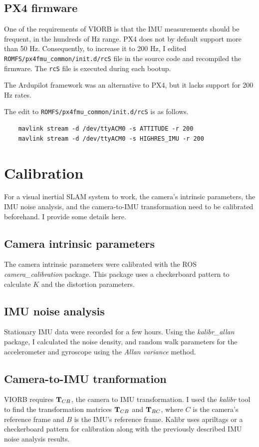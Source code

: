 \subsection{PX4 firmware}
One of the requirements of VIORB is that the IMU measurements should be frequent, in the hundreds of Hz range. PX4 does not by default support more than 50 Hz. Consequently, to increase it to 200 Hz, I edited \texttt{ROMFS/px4fmu\_common/init.d/rcS} file in the source code and recompiled the firmware.
The \texttt{rcS} file is executed during each bootup.

The Ardupilot framework was an alternative to PX4, but it lacks support for 200 Hz rates.

The edit to \texttt{ROMFS/px4fmu\_common/init.d/rcS} is as follows.

\begin{verbatim}
	mavlink stream -d /dev/ttyACM0 -s ATTITUDE -r 200        
	mavlink stream -d /dev/ttyACM0 -s HIGHRES_IMU -r 200
\end{verbatim}

\section{Calibration}
For a visual inertial SLAM system to work, the camera's intrinsic parameters, the IMU noise analysis, and the camera-to-IMU transformation need to be calibrated beforehand. I provide some details here.
 
\subsection{Camera intrinsic parameters}
The camera intrinsic parameters were calibrated with the ROS \textit{camera\_calibration} package. This package uses a checkerboard pattern to calculate $K$ and the distortion parameters.

\subsection{IMU noise analysis} \label{section:imu_bias_calculation}
Stationary IMU data were recorded for a few hours. Using the \textit{kalibr\_allan} package, I calculated the noise density, and random walk parameters for the accelerometer and gyroscope using the \textit{Allan variance} method. 

\subsection{Camera-to-IMU tranformation}
VIORB requires ${\bf T}_{CB}$, the camera to IMU transformation. I used the  \textit{kalibr} tool to find the transformation matrices ${\bf T}_{CB}$ and ${\bf T}_{BC}$, where $C$ is the camera's reference frame and $B$ is the IMU's reference frame. Kalibr uses apriltags or a checkerboard pattern for calibration along with the previously described IMU noise analysis results. 

